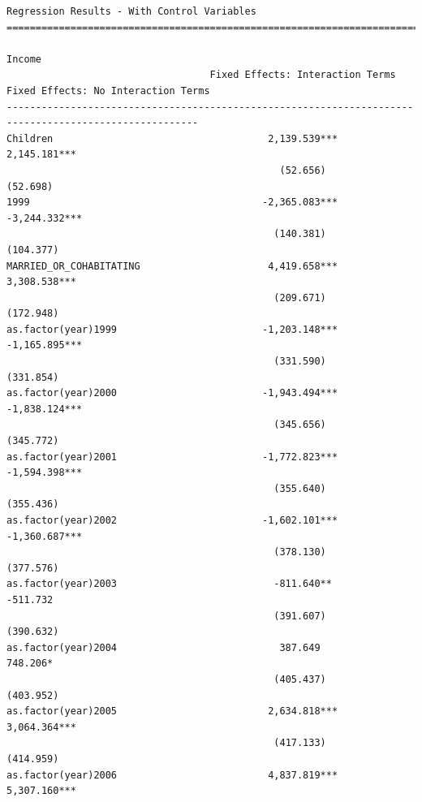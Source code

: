 \documentclass[
]{article}
\begin{document}
\begin{verbatim}
Regression Results - With Control Variables
=======================================================================================================
                                                                  Income                               
                                   Fixed Effects: Interaction Terms Fixed Effects: No Interaction Terms
-------------------------------------------------------------------------------------------------------
Children                                     2,139.539***                      2,145.181***            
                                               (52.656)                          (52.698)              
1999                                        -2,365.083***                      -3,244.332***           
                                              (140.381)                          (104.377)             
MARRIED_OR_COHABITATING                      4,419.658***                      3,308.538***            
                                              (209.671)                          (172.948)             
as.factor(year)1999                         -1,203.148***                      -1,165.895***           
                                              (331.590)                          (331.854)             
as.factor(year)2000                         -1,943.494***                      -1,838.124***           
                                              (345.656)                          (345.772)             
as.factor(year)2001                         -1,772.823***                      -1,594.398***           
                                              (355.640)                          (355.436)             
as.factor(year)2002                         -1,602.101***                      -1,360.687***           
                                              (378.130)                          (377.576)             
as.factor(year)2003                           -811.640**                         -511.732              
                                              (391.607)                          (390.632)             
as.factor(year)2004                            387.649                           748.206*              
                                              (405.437)                          (403.952)             
as.factor(year)2005                          2,634.818***                      3,064.364***            
                                              (417.133)                          (414.959)             
as.factor(year)2006                          4,837.819***                      5,307.160***            

\end{verbatim}
\end{document}
